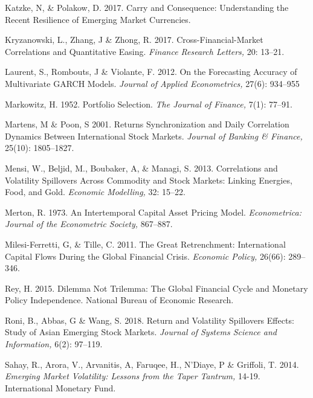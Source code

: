 \documentclass[11pt,preprint, authoryear]{elsarticle}
\numberwithin{equation}{section}
\numberwithin{figure}{section}
\numberwithin{table}{section}
\begin{document}
\leavevmode\hypertarget{ref-katzke2017carry}{}%
Katzke, N, \& Polakow, D. 2017. Carry and Consequence: Understanding
the Recent Resilience of Emerging Market Currencies.

\leavevmode\hypertarget{ref-kryzanowski2017cross}{}%
Kryzanowski, L., Zhang, J \& Zhong, R. 2017.
Cross-Financial-Market Correlations and Quantitative Easing.
\emph{Finance Research Letters,} 20: 13--21.

\leavevmode\hypertarget{ref-laurent2012forecasting}{}%
Laurent, S., Rombouts, J \& Violante, F. 2012.
On the Forecasting Accuracy of Multivariate GARCH Models.
\emph{Journal of Applied Econometrics,} 27(6): 934--955

\leavevmode\hypertarget{ref-markowitz1952portfolio}{}%
Markowitz, H. 1952. Portfolio Selection. \emph{The Journal of
Finance,} 7(1): 77--91.

\leavevmode\hypertarget{ref-martens2001returns}{}%
Martens, M \& Poon, S 2001. Returns Synchronization and
Daily Correlation Dynamics Between International Stock Markets.
\emph{Journal of Banking \& Finance,} 25(10): 1805--1827.

\leavevmode\hypertarget{ref-mensi2013correlations}{}%
Mensi, W., Beljid, M., Boubaker, A, \& Managi, S. 2013.
Correlations and Volatility Spillovers Across Commodity and Stock
Markets: Linking Energies, Food, and Gold. \emph{Economic Modelling,}
32: 15--22.

\leavevmode\hypertarget{ref-merton1973intertemporal}{}%
Merton, R. 1973. An Intertemporal Capital Asset Pricing
Model. \emph{Econometrica: Journal of the Econometric Society,}
867--887.

\leavevmode\hypertarget{ref-milesi2011great}{}%
Milesi-Ferretti, G, \& Tille, C. 2011. The Great
Retrenchment: International Capital Flows During the Global Financial
Crisis. \emph{Economic Policy,} 26(66): 289--346.

\leavevmode\hypertarget{ref-rey2015dilemma}{}%
Rey, H. 2015. Dilemma Not Trilemma: The Global Financial Cycle
and Monetary Policy Independence. National Bureau of Economic
Research.

\leavevmode\hypertarget{ref-roni2018return}{}%
Roni, B., Abbas, G \& Wang, S. 2018. Return and
Volatility Spillovers Effects: Study of Asian Emerging Stock Markets.
\emph{Journal of Systems Science and Information,} 6(2): 97--119.

\leavevmode\hypertarget{ref-sahay2014emerging}{}%
Sahay, R., Arora, V., Arvanitis, A, Faruqee, H.,  N'Diaye, P \& Griffoli, T. 2014.
\emph{Emerging Market Volatility: Lessons from the Taper Tantrum,}
14-19. International Monetary Fund.
\end{document}
